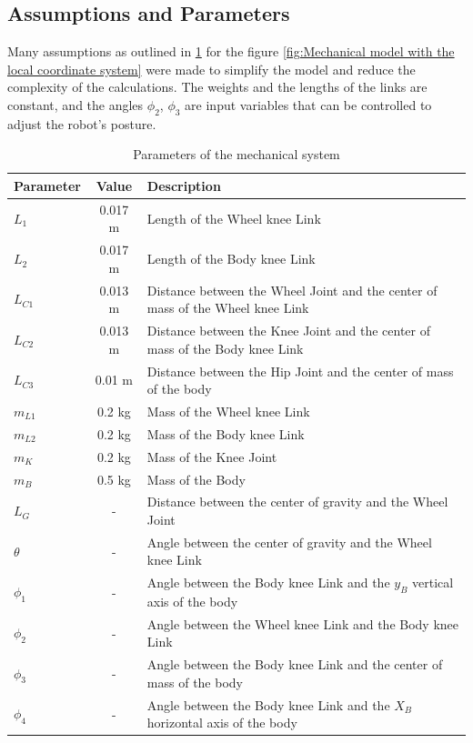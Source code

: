 \subsection{Assumptions and Parameters}
Many assumptions as outlined in \ref{tab:parameters} for the figure \ref{fig:Mechanical model with the local coordinate system} were made to simplify the model and reduce the complexity of the calculations. The weights and the lengths of the links are constant, and the angles $\phi_2$, $\phi_3$ are input variables that can be controlled to adjust the robot's posture.
	\begin{table}[h!]
		\centering
		\caption{Parameters of the mechanical system}
		\label{tab:parameters}
		\begin{tabular}{lcl}
			\toprule
			Parameter & Value & Description \\
			\midrule
			$L_1$ & 0.017 m & Length of the Wheel knee Link \\
			$L_2$ & 0.017 m & Length of the Body knee Link \\
			$L_{C1}$ & 0.013 m & Distance between the Wheel Joint and the center of mass of the Wheel knee Link \\
			$L_{C2}$ & 0.013 m & Distance between the Knee Joint and the center of mass of the Body knee Link \\
			$L_{C3}$ & 0.01 m & Distance between the Hip Joint and the center of mass of the body \\
			$m_{L1}$ & 0.2 kg & Mass of the Wheel knee Link \\
			$m_{L2}$ & 0.2 kg & Mass of the Body knee Link \\
			$m_K$ & 0.2 kg & Mass of the Knee Joint \\
			$m_B$ & 0.5 kg & Mass of the Body \\
			$L_G$ & - & Distance between the center of gravity and the Wheel Joint \\
			$\theta$ & - & Angle between the center of gravity and the Wheel knee Link \\
			$\phi_1$ & - & Angle between the Body knee Link and the $y_B$ vertical axis of the body \\
			$\phi_2$ & - & Angle between the Wheel knee Link and the Body knee Link \\
			$\phi_3$ & - & Angle between the Body knee Link and the center of mass of the body \\
			$\phi_4$ & - & Angle between the Body knee Link and the $X_B$ horizontal axis of the body \\

\end{tabular}
\end{table}

